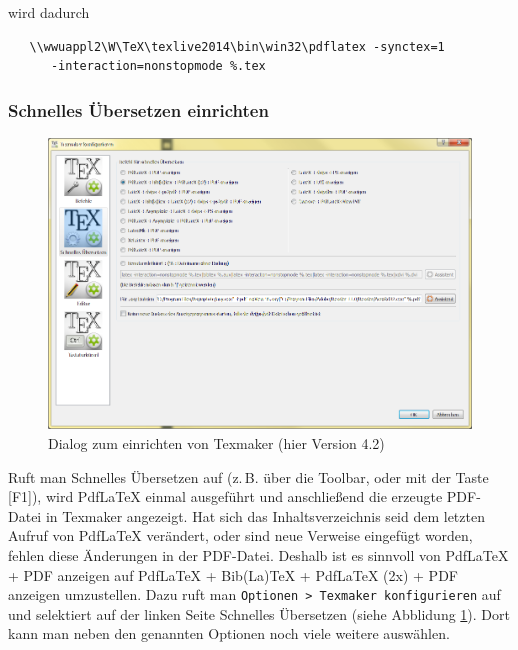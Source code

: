 wird dadurch

\begin{verbatim}
   \\wwuappl2\W\TeX\texlive2014\bin\win32\pdflatex -synctex=1
      -interaction=nonstopmode %.tex
\end{verbatim}

\subsubsection{Schnelles Übersetzen einrichten}

\begin{figure}[bh]
\includegraphics[width=\textwidth]{Bilder/Texmaker_konfigurieren2.png}
\caption{Dialog zum einrichten von Texmaker (hier Version 4.2)}
\label{texmaker_konf2}
\end{figure}

Ruft man Schnelles Übersetzen auf (z.\,B. über die Toolbar, oder mit der Taste [F1]), wird PdfLaTeX einmal ausgeführt und anschließend die erzeugte PDF-Datei in Texmaker angezeigt. Hat sich das Inhaltsverzeichnis seid dem letzten Aufruf von PdfLaTeX verändert, oder sind neue Verweise eingefügt worden, fehlen diese Änderungen in der PDF-Datei. Deshalb ist es sinnvoll von  PdfLaTeX + PDF anzeigen auf PdfLaTeX + Bib(La)TeX + PdfLaTeX (2x) + PDF anzeigen umzustellen. Dazu ruft man \verb+Optionen > Texmaker konfigurieren+ auf und selektiert auf der linken Seite Schnelles Übersetzen (siehe Abblidung \ref{texmaker_konf2}). Dort kann man neben den genannten Optionen noch viele weitere auswählen.
